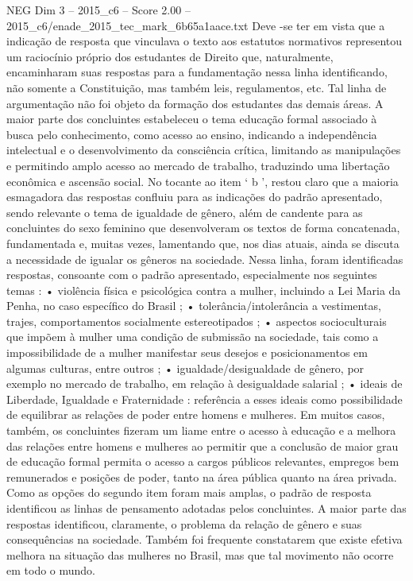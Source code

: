 \begin{textsample}{NEG Dim 3 – 2015\_c6 – Score 2.00 – 2015\_c6/enade\_2015\_tec\_mark\_6b65a1aace.txt}
Deve -se ter em vista que a indicação de resposta que vinculava o texto aos estatutos normativos representou um raciocínio próprio dos estudantes de Direito que, naturalmente, encaminharam suas respostas para a fundamentação nessa linha identificando, não somente a Constituição, mas também leis, regulamentos, etc.
Tal linha de argumentação não foi objeto da formação dos estudantes das demais áreas.
A maior parte dos concluintes estabeleceu o tema educação formal associado à busca pelo conhecimento, como acesso ao ensino, indicando a independência intelectual e o desenvolvimento da consciência crítica, limitando as manipulações e permitindo amplo acesso ao mercado de trabalho, traduzindo uma libertação econômica e ascensão social.
No tocante ao item ‘ b ’, restou claro que a maioria esmagadora das respostas confluiu para as indicações do padrão apresentado, sendo relevante o tema de igualdade de gênero, além de candente para as concluintes do sexo feminino que desenvolveram os textos de forma concatenada, fundamentada e, muitas vezes, lamentando que, nos dias atuais, ainda se discuta a necessidade de igualar os gêneros na sociedade.
Nessa linha, foram identificadas respostas, consoante com o padrão apresentado, especialmente nos seguintes temas : • violência física e psicológica contra a mulher, incluindo a Lei Maria da Penha, no caso específico do Brasil ; • tolerância/intolerância a vestimentas, trajes, comportamentos socialmente estereotipados ; • aspectos socioculturais que impõem à mulher uma condição de submissão na sociedade, tais como a impossibilidade de a mulher manifestar seus desejos e posicionamentos em algumas culturas, entre outros ; • igualdade/desigualdade de gênero, por exemplo no mercado de trabalho, em relação à desigualdade salarial ; • ideais de Liberdade, Igualdade e Fraternidade : referência a esses ideais como possibilidade de equilibrar as relações de poder entre homens e mulheres.
Em muitos casos, também, os concluintes fizeram um liame entre o acesso à educação e a melhora das relações entre homens e mulheres ao permitir que a conclusão de maior grau de educação formal permita o acesso a cargos públicos relevantes, empregos bem remunerados e posições de poder, tanto na área pública quanto na área privada.
Como as opções do segundo item foram mais amplas, o padrão de resposta identificou as linhas de pensamento adotadas pelos concluintes.
A maior parte das respostas identificou, claramente, o problema da relação de gênero e suas consequências na sociedade.
Também foi frequente constatarem que existe efetiva melhora na situação das mulheres no Brasil, mas que tal movimento não ocorre em todo o mundo.

\end{textsample}
